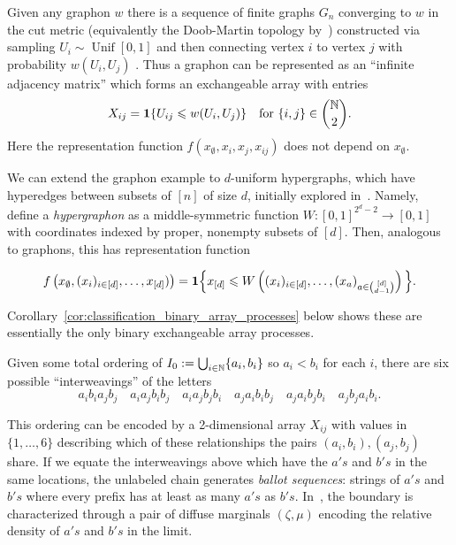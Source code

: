 \begin{example}
\label{example:graphon_chain}
    Given any graphon $w$ there is a sequence of finite graphs $G_n$ converging to $w$ in the
    cut metric (equivalently the Doob-Martin topology by~\cite{grubel2015_persisting_randomness_graphs_search_trees})
    constructed via sampling $U_i \sim \operatorname{Unif}[0,1]$ and then connecting vertex $i$ to vertex
     $j$ with probability $w(U_i, U_j)$ \cite{lovasz2004_limits_dense_graph_sequences,borgs2007_convergent_dense_graph_sequences}. Thus a graphon can be represented as an ``infinite adjacency matrix''
     which forms an exchangeable array with entries
    \[X_{ij} = \mathbf{1} \{U_{ij} \leqslant w(U_i, U_j)\} \quad \text{for } \{i,j\} \in \binom{\mathbb{N}}{2}.\]
    \noindent Here the representation function $f(x_\emptyset, x_i, x_j, x_{ij})$ does not depend on $x_\emptyset$.
\end{example}

\begin{example}
    We can extend the graphon example to $d$-uniform hypergraphs, which have hyperedges between subsets of $[n]$ of size $d$, initially explored in~\cite{elek2007_limits_hypergraphs_regularity_lemmas}. Namely, define a \textit{hypergraphon} as a middle-symmetric function $W:[0,1]^{2^d-2} \to [0,1]$ with coordinates indexed by proper, nonempty subsets of $[d]$. Then, analogous to graphons, this has representation function

    \[f\left(x_\emptyset, (x_i)_{i \in [d]}, \ldots, x_{[d]})\right) = \mathbf{1} \Big \{x_{[d]} \leqslant W\left((x_i)_{i \in [d]}, \ldots,  (x_a)_{a \in \binom{[d]}{d-1}}\right) \Big \}.\]

    \noindent Corollary~\ref{cor:classification_binary_array_processes} below shows these are essentially the only binary exchangeable array processes.
\end{example}

\begin{example}
Given some total ordering of $I_0 := \bigcup_{i \in \mathbb{N}} \{a_i, b_i\}$ so $a_i < b_i$ for each $i$, there
are six possible ``interweavings'' of the letters
%
\[a_ib_ia_jb_j \quad a_i a_j b_i b_j \quad a_i a_j b_j b_i \quad a_j a_i b_i b_j \quad a_j a_i b_j b_i \quad a_j b_j a_i b_i.\]

\noindent This ordering can be encoded by a 2-dimensional array $X_{ij}$ with values in $\{1,\ldots,6\}$
describing which of these relationships the pairs $(a_i, b_i), (a_j, b_j)$ share.
If we equate the interweavings above which have the $a's$ and $b's$ in the same locations,
the unlabeled chain generates \textit{ballot sequences}: strings of $a's$ and $b's$ where every prefix
has at least as many $a's$ as $b's$. In~\cite{choi2023_doob_martin_growing_ballot_sequences}, the boundary is characterized through
a pair of diffuse marginals $(\zeta, \mu)$ encoding the relative density of $a's$ and $b's$ in the limit.
\end{example}

